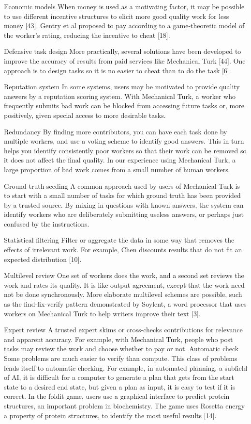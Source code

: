 \documentclass{acm_proc_article-sp} %
\begin{document}
Economic models When money is used as a motivating factor, it may be possible to use different incentive structures to elicit more good quality work for less money [43].  Gentry et al proposed to pay according to a game-theoretic model of the worker’s rating, reducing the incentive to cheat [18].

Defensive task design More practically, several solutions have been developed to improve the accuracy of results from paid services like Mechanical Turk [44]. One approach is to design tasks so it is no easier to cheat than to do the task [6]. 

Reputation system In some systems, users may be motivated to provide quality answers by a reputation scoring system. With Mechanical Turk, a worker who frequently submits bad work can be blocked from accessing future tasks or, more positively, given special access to more desirable tasks. 

Redundancy By finding more contributors, you can have each task done by multiple workers, and use a voting scheme to identify good answers. This in turn helps you identify consistently poor workers so that their work can be removed so it does not affect the final quality. In our experience using Mechanical Turk, a large proportion of bad work comes from a small number of human workers. 

Ground truth seeding A common approach used by users of Mechanical Turk is to start with a small number of tasks for which ground truth has been provided by a trusted source. By mixing in questions with known answers, the system can identify workers who are deliberately submitting useless answers, or perhaps just confused by the instructions. 

Statistical filtering Filter or aggregate the data in some way that removes the effects of irrelevant work. For example, Chen discounts results that do not fit an expected distribution [10]. 

Multilevel review One set of workers does the work, and a second set reviews the work and rates its quality. It is like output agreement, except that the work need not be done synchronously.  More elaborate multilevel schemes are possible, such as the find-fix-verify pattern demonstrated by Soylent, a word processor that uses workers on Mechanical Turk to help writers improve their text [3]. 

Expert review A trusted expert skims or cross-checks contributions for relevance and apparent accuracy. For example, with Mechanical Turk, people who post tasks may review the work and choose whether to pay or not. Automatic check Some problems are much easier to verify than compute.  This class of problems lends itself to automatic checking. For example, in automated planning, a subfield of AI, it is difficult for a computer to generate a plan that gets from the start state to a desired end state, but given a plan as input, it is easy to test if it is correct. In the foldit game, users use a graphical interface to predict protein structures, an important problem in biochemistry. The game uses Rosetta energy a property of protein structures, to identify the most useful results [14]. 
\end{document}
